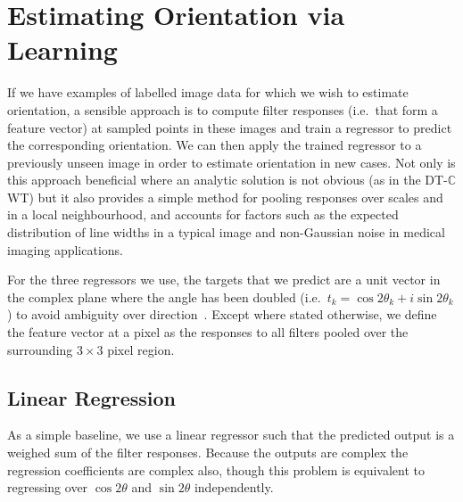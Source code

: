 \documentclass[runningheads,a4paper]{llncs}
\def\dtcwt{DT-$\mathbb{C}$WT}
\def\ie{i.e.}
\def\eg{e.g.}
\newcommand{\comment}[1]{}
\begin{document}
\section{Estimating Orientation via Learning}
\label{s:learning}
If we have examples of labelled image data for which we wish to estimate orientation, a sensible approach is to compute filter responses (\ie~that form a feature vector) at sampled points in these images and train a regressor to predict the corresponding orientation. We can then apply the trained regressor to a previously unseen image in order to estimate orientation in new cases. Not only is this approach beneficial where an analytic solution is not obvious (as in the \dtcwt) but it also provides a simple method for pooling responses over scales and in a local neighbourhood, and accounts for factors such as the expected distribution of line widths in a typical image and non-Gaussian noise in medical imaging applications.

For the three regressors we use, the targets that we predict are a unit vector in the complex plane where the angle has been doubled (\ie~$t_k = \cos 2\theta_k + i\sin 2\theta_k$) to avoid ambiguity over direction~\cite{Mardia_Jupp_00}. Except where stated otherwise, we define the feature vector at a pixel as the responses to all filters pooled over the surrounding $3{\times}3$ pixel region.


\subsection{Linear Regression}
\label{s:learning_linear}
As a simple baseline, we use a linear regressor such that the predicted output is a weighed sum of the filter responses. Because the outputs are complex the regression coefficients are complex also, though this problem is equivalent to regressing over $\cos 2\theta$ and $\sin 2\theta$ independently.

\comment{We may want to reintroduce a note here that there are two solutions to the orientation, and that this cannot be estimated from a linear regression alone (at least for the double angle representations)}

\end{document}
